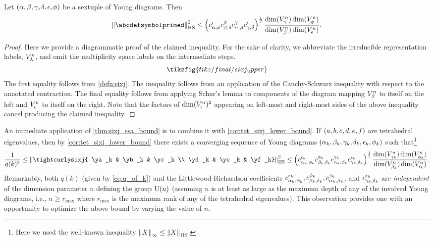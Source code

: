 \documentclass[notitlepage, 10pt]{article}
\begin{document}
\begin{thm}
    \label{thm:sixj_ssa_bound}
    Let $(\alpha,\beta,\gamma,\delta,\epsilon,\phi)$ be a sextuple of Young diagrams.
    Then
    \begin{equation}
        \norm{\abcdefsymbolprimed}_{\text{HS}}^{2}
        \leq \left(c_{\ya,\yf}^{\ye}c_{\yb,\yd}^{\yf}c_{\ya,\yb}^{\yc}c_{\yc,\yd}^{\ye}\right)^{\frac{1}{2}} \frac{\dim(V_{\yc}^n) \dim(V_{\yf}^n)}{\dim(V_{\yb}^n) \dim(V_{\ye}^n)}.
    \end{equation}
\end{thm}
\begin{proof}
    Here we provide a diagrammatic proof of the claimed inequality.
    For the sake of clarity, we abbreviate the irreducible representation labels, $V_{\lambda}^{n}$, and omit the multiplicity space labels on the intermediate steps.
    \begin{equation}
        \tikzfig{tikz/final/sixj_upper}
    \end{equation}
    The first equality follows from \cref{defn:sixj}.
    The inequality follows from an application of the Cauchy-Schwarz inequality with respect to the annotated contraction.
    The final equality follows from applying Schur's lemma to components of the diagram mapping $V_{\beta}^{n}$ to itself on the left and $V_{\epsilon}^{n}$ to itself on the right.
    Note that the factors of $\dim(V_{\epsilon}^{n})^2$ appearing on left-most and right-most sides of the above inequality cancel producing the claimed inequality.
\end{proof}

An immediate application of \cref{thm:sixj_ssa_bound} is to combine it with \cref{cor:tet_sixj_lower_bound}.
If $(a,b,c,d,e,f)$ are tetrahedral eigenvalues, then by \cref{cor:tet_sixj_lower_bound} there exists a converging sequence of Young diagrams $(\alpha_k, \beta_k, \gamma_k, \delta_k, \epsilon_k, \phi_k)$ such that\footnote{Here we used the well-known inequality $\left\lVert X\right\rVert_{\infty} \leq \left\lVert X\right\rVert_{\text{HS}}$.}
\begin{equation}
    \label{eq:combined_bound}
    \frac{1}{q(k)^2} \leq \norm{\tightcurlysixj{ \ya_k & \yb_k & \yc_k \\ \yd_k & \ye_k & \yf_k}}_{\text{HS}}^2 \leq \left(c_{\ya_k,\yf_k}^{\ye_k}c_{\yb_k,\yd_k}^{\yf_k}c_{\ya_k,\yb_k}^{\yc_k}c_{\yc_k,\yd_k}^{\ye_k}\right)^{\frac{1}{2}} \frac{\dim(V_{\yc_k}^n) \dim(V_{\yf_k}^n)}{\dim(V_{\yb_k}^n) \dim(V_{\ye_k}^n)}.
\end{equation}
Remarkably, both $q(k)$ (given by \cref{eq:q_of_k}) and the Littlewood-Richardson coefficients $c_{\alpha_k,\phi_k}^{\epsilon_k}, c_{\beta_k,\delta_k}^{\phi_k}, c_{\alpha_k,\beta_k}^{\gamma_k}$, and $c_{\gamma_k,\delta_k}^{\epsilon_k}$ are \textit{independent} of the dimension parameter $n$ defining the group $\operatorname{U}(n)$ (assuming $n$ is at least as large as the maximum depth of any of the involved Young diagrams, i.e., $n \geq r_{\max}$ where $r_{\max}$ is the maximum rank of any of the tetrahedral eigenvalues).
This observation provides one with an opportunity to optimize the above bound by varying the value of $n$.
\end{document}
